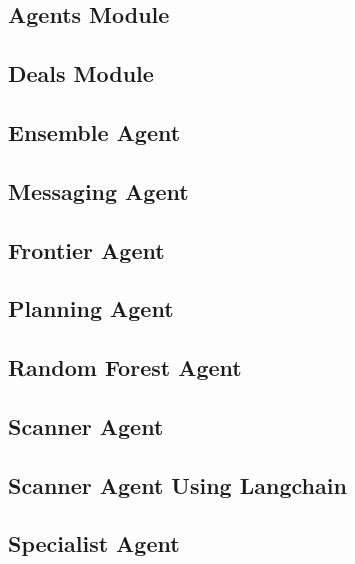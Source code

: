 \documentclass[12pt,twoside,openright]{book}
\begin{document}
\subsection{Agents Module}


\newpage
\subsection{Deals Module}


\newpage
\subsection{Ensemble Agent}


\newpage
\subsection{Messaging Agent}


\newpage
\subsection{Frontier Agent}


\newpage
\subsection{Planning Agent}


\newpage
\subsection{Random Forest Agent}


\newpage
\subsection{Scanner Agent}


\newpage
\subsection{Scanner Agent Using Langchain}


\newpage
\subsection{Specialist Agent}

\end{document}
